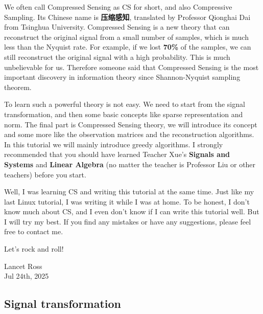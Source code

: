 \documentclass[12pt]{ctexart}
\begin{document}
We often call Compressed Sensing as CS for short, and also Compressive Sampling. Its
Chinese name is \textbf{压缩感知}, translated by Professor Qionghai Dai from Tsinghua
University. Compressed Sensing is a new theory that can reconstruct the original signal
from a small number of samples, which is much less than the Nyquist rate. For example, if
we lost \textbf{70\%} of the samples, we can still reconstruct the original signal with a
high probability. This is much unbelievable for us. Therefore someone said that Compressed
Sensing is the most important discovery in information theory since Shannon-Nyquist
sampling theorem.

To learn such a powerful theory is not easy. We need to start from the signal
transformation, and then some basic concepts like sparse representation and norm. The
final part is Compressed Sensing theory, we will introduce its concept and some
more like the observation matrices and the reconstruction algorithms. In this tutorial
we will mainly introduce greedy algorithms. I strongly recommended that you should have learned Teacher
Xue's \textbf{Signals and Systems} and \textbf{Linear Algebra} (no matter the teacher is 
Professor Liu or other teachers) before you start. 

Well, I was learning CS and writing this tutorial at the same time. Just like my last Linux
tutorial, I was writing it while I was at home. To be honest, I don't know much about CS,
and I even don't know if I can write this tutorial well. But I will try my best. If you find
any mistakes or have any suggestions, please feel free to contact me.

Let's rock and roll!

\begin{flushright}
  Lancet Ross\\
  Jul 24th, 2025
\end{flushright}

\newpage
\thispagestyle{empty}
\begin{center}
    \vspace*{96pt}
    \fontsize{60}{60}\par
    \fontsize{26}{31.2}\section{\textbf{Signal transformation}}\par %
    \vspace{25pt}
    \fontsize{18}{21.6}\par %
    \vfill
\end{center}
\end{document}
